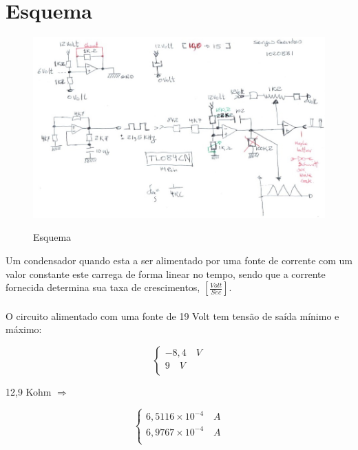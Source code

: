\section{Esquema}
\begin{figure}[H]
	\centering
	\includegraphics[scale=0.7]{./image/esquema.jpg}\\
	\caption{Esquema}
\end{figure}
Um condensador quando esta a ser alimentado por uma fonte de corrente com um valor constante este carrega de forma linear no tempo, sendo que a corrente fornecida determina sua taxa de crescimentos, $\left[ \frac{Volt}{Sec} \right]$.\\ \\
O circuito alimentado com uma fonte de 19 Volt tem tensão de saída mínimo e máximo: \\
\begin{minipage}[l]{0pt}
	$$\left\lbrace\begin{array}{c}
 	-8,4 \quad V \\
 	9 \quad V \\
 \end{array}\right.$$
\end{minipage}
\hspace{3cm} 12,9 Kohm \qquad $\Longrightarrow$ \hspace{1cm}
\begin{minipage}[l]{0pt}
	$$\left\lbrace\begin{array}{c}
		6,5116 \times 10^{-4} \quad A \\
		6,9767 \times 10^{-4} \quad A \\
	\end{array}\right.$$
\end{minipage}\\
\\
